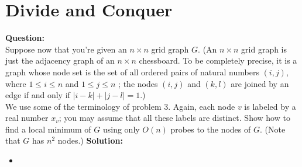 \section{Divide and Conquer}
\textbf{Question:} \\
Suppose now that you’re given an $n\times n$ grid graph $G$. (An $n\times n$  grid graph is just the adjacency graph of an $n\times n$ chessboard. To be completely precise, it is a graph whose node set is the set of all ordered pairs of natural numbers $(i,j)$, where $1\leq i\leq n$ and $1\leq j \leq n$ ; the nodes $(i,j)$ and $(k,l)$ are joined by an edge if and only if $|i-k| + |j-l| = 1$.) \\
We use some of the terminology of problem 3. Again, each node $v$ is labeled by a real number $x_v$; you may assume that all these labels are distinct. Show how to find a local minimum of $G$ using only $O(n)$ probes to the nodes of $G$. (Note that $G$ has $n^2$ nodes.)
\textbf{Solution:} \\
\begin{itemize}
	\item 
	
	
	
\end{itemize}
